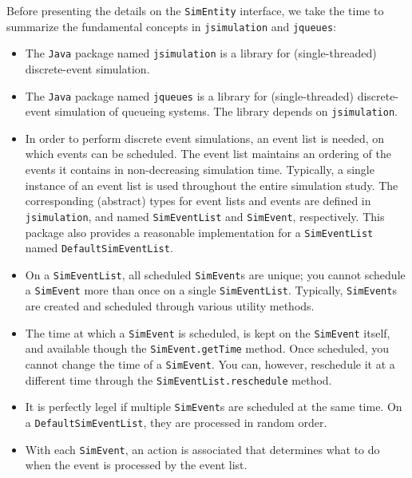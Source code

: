 \documentclass[12pt]{book}
\begin{document}
Before presenting the details on the \lstinline|SimEntity| interface,
  we take the time to summarize the fundamental concepts in
  \lstinline|jsimulation| and \lstinline|jqueues|:
\begin{itemize}
  \item The \lstinline|Java| package named \lstinline|jsimulation|
          is a library for (single-threaded) discrete-event simulation.
  \item The \lstinline|Java| package named \lstinline|jqueues|
          is a library for (single-threaded) discrete-event simulation
          of queueing systems.
        The library depends on \lstinline|jsimulation|.
  \item In order to perform discrete event simulations,
          an event list is needed, on which events can be scheduled.
        The event list maintains an ordering of the events it contains
          in non-decreasing simulation time.
        Typically, a single instance of an event list is used
          throughout the entire simulation study.
        The corresponding (abstract) types
          for event lists and events are defined in \lstinline|jsimulation|,
          and named \lstinline|SimEventList| and \lstinline|SimEvent|, respectively.
        This package also provides a reasonable implementation for
          a \lstinline|SimEventList| named \lstinline|DefaultSimEventList|.
  \item On a \lstinline|SimEventList|, all scheduled \lstinline|SimEvent|s are
          unique; you cannot schedule a \lstinline|SimEvent| more than once
          on a single \lstinline|SimEventList|.
        Typically, \lstinline|SimEvent|s are created and scheduled through
          various utility methods.
  \item The time at which a \lstinline|SimEvent| is scheduled,
          is kept on the \lstinline|SimEvent| itself,
          and available though the \lstinline|SimEvent.getTime| method.
        Once scheduled, you cannot change the time of a \lstinline|SimEvent|.
        You can, however, reschedule it at a different time
          through the \lstinline|SimEventList.reschedule| method.
  \item It is perfectly legel if multiple \lstinline|SimEvent|s are scheduled
          at the same time.
        On a \lstinline|DefaultSimEventList|, they are processed in random order.
  \item With each \lstinline|SimEvent|, an action is associated that determines
          what to do when the event is processed by the event list.

\end{itemize}
\end{document}
